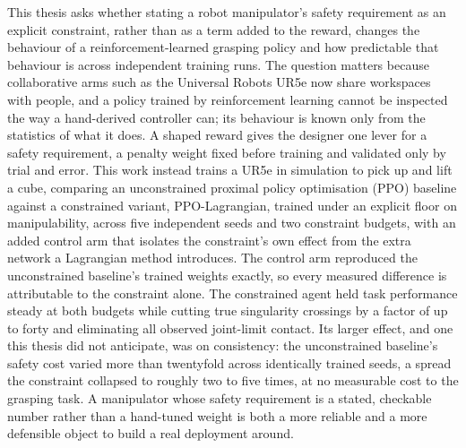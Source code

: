 
This thesis asks whether stating a robot manipulator's safety requirement as an explicit
constraint, rather than as a term added to the reward, changes the behaviour of a
reinforcement-learned grasping policy and how predictable that behaviour is across independent
training runs. The question matters because collaborative arms such as the Universal Robots UR5e
now share workspaces with people, and a policy trained by reinforcement learning cannot be
inspected the way a hand-derived controller can; its behaviour is known only from the statistics
of what it does. A shaped reward gives the designer one lever for a safety requirement, a penalty
weight fixed before training and validated only by trial and error. This work instead trains a
UR5e in simulation to pick up and lift a cube, comparing an unconstrained proximal policy
optimisation (PPO) baseline against a constrained variant, PPO-Lagrangian, trained under an
explicit floor on manipulability, across five independent seeds and two constraint budgets, with
an added control arm that isolates the constraint's own effect from the extra network a Lagrangian
method introduces. The control arm reproduced the unconstrained baseline's trained weights
exactly, so every measured difference is attributable to the constraint alone. The constrained
agent held task performance steady at both budgets while cutting true singularity crossings by a
factor of up to forty and eliminating all observed joint-limit contact. Its larger effect, and one
this thesis did not anticipate, was on consistency: the unconstrained baseline's safety cost
varied more than twentyfold across identically trained seeds, a spread the constraint collapsed to
roughly two to five times, at no measurable cost to the grasping task. A manipulator whose safety
requirement is a stated, checkable number rather than a hand-tuned weight is both a more reliable
and a more defensible object to build a real deployment around.

\clearpage
